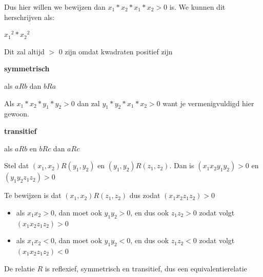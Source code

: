 \documentclass[11pt, a4paper]{article}
\begin{document}
Dus hier willen we bewijzen dan $x_1 * x_2 * x_1 * x_2 > 0$ is. We kunnen dit herschrijven als:

${x_1}^2 * {x_2}^2$

Dit zal altijd $>$ 0 zijn omdat kwadraten positief zijn







\textbf{symmetrisch}

als $aRb$ dan $bRa$

Als $x_1 * x_2 * y_1 * y_2 > 0$ dan zal $y_1 * y_2 * x_1 * x_2 > 0$ want je vermenigvuldigd hier gewoon.


\textbf{transitief}

als $aRb$ en $bRc$ dan $aRc$

Stel dat $(x_1,x_2) R (y_1,y_2) $ en $(y_1,y_2) R (z_1,z_2) $. Dan is $(x_1 x_2 y_1 y_2) > 0$ en $(y_1 y_2 z_1 z_2) > 0 $

Te bewijzen is dat $(x_1,x_2)R(z_1, z_2)$ dus zodat $(x_1 x_2 z_1 z_2) > 0 $

\begin{itemize}
	\item als $x_1 x_2 > 0$, dan moet ook $y_1 y_2 > 0$, en dus ook $z_1 z_2 > 0$ zodat volgt $(x_1 x_2 z_1 z_2) > 0 $ 
	\item als $x_1 x_2 < 0$, dan moet ook $y_1 y_2 < 0$, en dus ook $z_1 z_2 < 0$ zodat volgt $(x_1 x_2 z_1 z_2) < 0 $ 
\end{itemize}

De relatie $R$ is reflexief, symmetrisch en transitief, dus een equivalentierelatie
\end{document}
